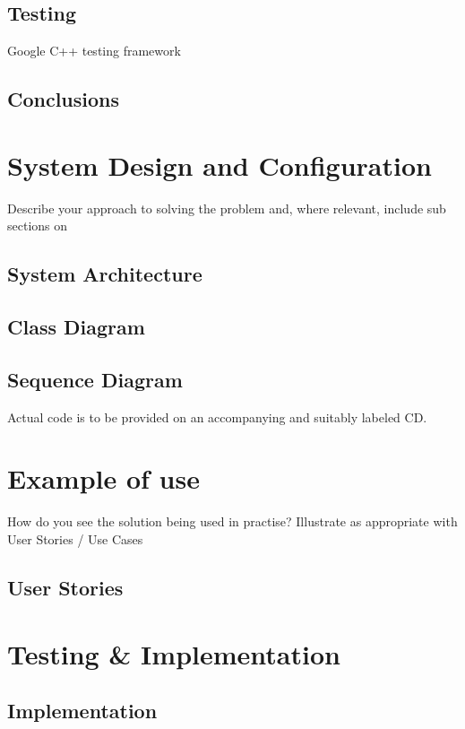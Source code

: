 \documentclass[12pt,a4paper,titlepage]{article}
\begin{document}
\subsection{Testing}
Google C++ testing framework

\subsection{Conclusions}

\section{System Design and Configuration}
Describe your approach to solving the problem and, where relevant, include sub sections on

\subsection{System Architecture}

\subsection{Class Diagram}

\subsection{Sequence Diagram}

Actual code is to be provided on an accompanying and suitably labeled CD.

\section{Example of use}
How do you see the solution being used in practise? Illustrate as appropriate with User Stories / Use Cases 

\subsection{User Stories}

\section{Testing \& Implementation}

\subsection{Implementation}
\end{document}
